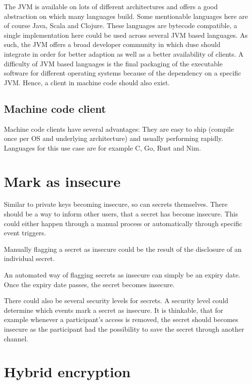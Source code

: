 The JVM is available on lots of different architectures and offers a good 
abstraction on which many languages build. Some mentionable languages here are
of course Java, Scala and Clojure. These languages are bytecode compatible,
a single implementation here could be used across several JVM based languages.
As such, the JVM offers a broad developer community in which duse should
integrate in order for better adaption as well as a better availability of
clients. A difficulty of JVM based languages is the final packaging of the
executable software for different operating systems because of the dependency
on a specific JVM. Hence, a client in machine code should also exist.

\subsection{Machine code client}

Machine code clients have several advantages: They are easy to ship (compile
once per OS and underlying architecture) and usually performing rapidly.
Languages for this use case are for example C, Go, Rust and Nim.

\section{Mark as insecure}
\label{sec:mark_as_insecure}

Similar to private keys becoming insecure, so can secrets themselves. There
should be a way to inform other users, that a secret has become insecure. This
could either happen through a manual process or automatically through specific
event triggers.

Manually flagging a secret as insecure could be the result of the disclosure of
an individual secret.

An automated way of flagging secrets as insecure can simply be an expiry date.
Once the expiry date passes, the secret becomes insecure.

There could also be several security levels for secrets. A security level could
determine which events mark a secret as insecure. It is thinkable, that for
example whenever a participant's access is removed, the secret should becomes
insecure as the participant had the possibility to save the secret through
another channel.

\section{Hybrid encryption}

